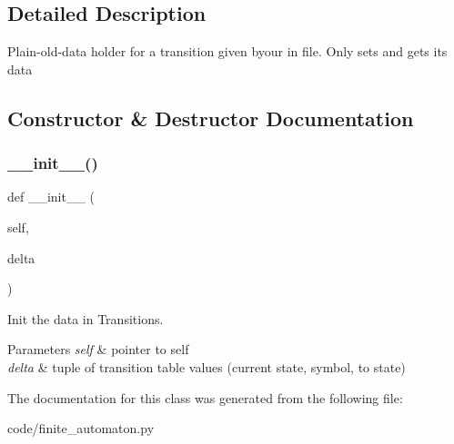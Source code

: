 \subsection{Detailed Description}
\begin{DoxyVerb}Plain-old-data holder for a transition given byour in file.  Only sets and gets its data
\end{DoxyVerb}
 

\subsection{Constructor \& Destructor Documentation}
\mbox{\label{classfinite__automaton_1_1delta_ad6a72e806e6cfa1854686b4830777ced}} 
\subsubsection{\texorpdfstring{\+\_\+\+\_\+init\+\_\+\+\_\+()}{\_\_init\_\_()}}
{\footnotesize\ttfamily def \+\_\+\+\_\+init\+\_\+\+\_\+ (\begin{DoxyParamCaption}\item[{}]{self,  }\item[{}]{delta }\end{DoxyParamCaption})}



Init the data in Transitions. 


\begin{DoxyParams}{Parameters}
{\em self} & pointer to self \\
\hline
{\em delta} & tuple of transition table values (current state, symbol, to state) \\
\hline
\end{DoxyParams}


The documentation for this class was generated from the following file\+:\begin{DoxyCompactItemize}
\item 
code/finite\+\_\+automaton.\+py\end{DoxyCompactItemize}
